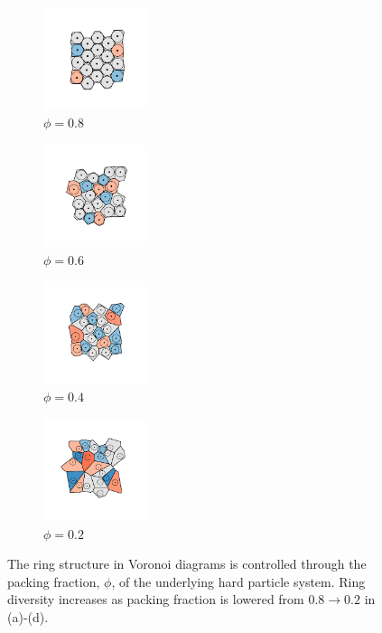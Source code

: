 \begin{figure}[bt]
     \centering
          \begin{subfigure}[b]{0.24\textwidth}
         \centering
         \includegraphics[height=3cm]{./figures/methods/voro_mono_80.pdf}
         \caption{$\phi=0.8$}
         \label{fig:voromono1}
     \end{subfigure}
     \hfill
     \begin{subfigure}[b]{0.24\textwidth}
         \centering
         \includegraphics[height=3cm]{./figures/methods/voro_mono_60.pdf}
         \caption{$\phi=0.6$}
         \label{fig:voromono2}
     \end{subfigure}
     \hfill
     \begin{subfigure}[b]{0.24\textwidth}
         \centering
         \includegraphics[height=3cm]{./figures/methods/voro_mono_40.pdf}
         \caption{$\phi=0.4$}
         \label{fig:voromono3}
     \end{subfigure}
     \hfill
       \begin{subfigure}[b]{0.24\textwidth}
         \centering
         \includegraphics[height=3cm]{./figures/methods/voro_mono_20.pdf}
         \caption{$\phi=0.2$}
         \label{fig:voromono4}
     \end{subfigure}
     \caption{The ring structure in Voronoi diagrams is controlled through the packing fraction, $\phi$, of the underlying hard particle system. Ring diversity increases as packing fraction is lowered from $0.8\rightarrow 0.2$ in (a)\--(d).}
     \label{fig:voromono}
\end{figure}

